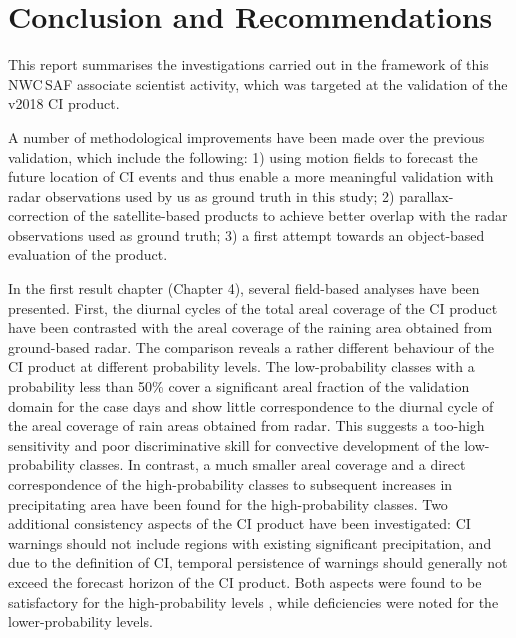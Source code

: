 \chapter{Conclusion and Recommendations}

This report summarises the investigations carried out in the framework of this NWC\,SAF associate scientist activity, which was targeted at the validation of the v2018 CI product. 

A number of methodological improvements have been made over the previous validation, which include the following: 1) using motion fields to forecast the future location of CI events and thus enable a more meaningful validation with radar observations used by us as ground truth in this study; 2) parallax-correction of the satellite-based products to achieve better overlap with the radar observations used as ground truth; 3) a first attempt towards an object-based evaluation of the product. 

In the first result chapter (Chapter 4), several field-based analyses have been presented. First, the diurnal cycles of the total areal coverage of the CI product have been contrasted with the areal coverage of the raining area obtained from ground-based radar. The comparison reveals a rather different behaviour of the CI product at different probability levels. The low-probability classes with a probability less than 50\% cover a significant areal fraction of the validation domain for the case days and show little correspondence to the diurnal cycle of the areal coverage of rain areas obtained from radar. This suggests a too-high sensitivity and poor discriminative skill for convective development of the low-probability classes.
In contrast, a much smaller areal coverage and a direct correspondence of the high-probability classes to subsequent increases in precipitating area have been found for the high-probability classes. 
Two additional consistency aspects of the CI product have been investigated: CI warnings should not include regions with existing significant precipitation, and due to the definition of CI, temporal persistence of warnings should generally not exceed the forecast horizon of the CI product. Both aspects were found to be satisfactory for the high-probability levels , while deficiencies were noted for the lower-probability levels.

